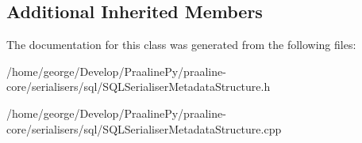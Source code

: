 \subsection*{Additional Inherited Members}


The documentation for this class was generated from the following files\+:\begin{DoxyCompactItemize}
\item 
/home/george/\+Develop/\+Praaline\+Py/praaline-\/core/serialisers/sql/S\+Q\+L\+Serialiser\+Metadata\+Structure.\+h\item 
/home/george/\+Develop/\+Praaline\+Py/praaline-\/core/serialisers/sql/S\+Q\+L\+Serialiser\+Metadata\+Structure.\+cpp\end{DoxyCompactItemize}
